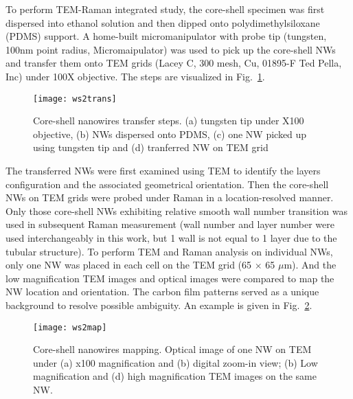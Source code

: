 To perform TEM-Raman integrated study, the core-shell specimen was first dispersed into ethanol solution and then dipped onto polydimethylsiloxane (PDMS) support. A home-built micromanipulator with probe tip (tungsten, 100nm point radius, Micromaipulator) was used to pick up the core-shell NWs and transfer them onto TEM grids (Lacey C, 300 mesh, Cu, 01895-F Ted Pella, Inc) under 100X objective. The steps are visualized in Fig.~\ref{fig:ch5ws2trans}. 
\begin{figure}[htb]
\centering
\texttt{[image: ws2trans]}
\caption[Core-shell nanowires transfer steps]{Core-shell nanowires transfer steps. (a) tungsten tip under X100 objective, (b) NWs dispersed onto PDMS, (c) one NW picked up using tungsten tip and (d) tranferred NW on TEM grid}
\label{fig:ch5ws2trans}
\end{figure}
The transferred NWs were first examined using TEM to identify the  layers configuration and the associated geometrical orientation. Then the core-shell NWs on TEM grids were probed under Raman in a location-resolved manner. Only those core-shell NWs exhibiting relative smooth  wall number transition was used in subsequent Raman measurement (wall number and layer number were used interchangeably in this work, but 1 wall is not equal to 1 layer due to the tubular structure). To perform TEM and Raman analysis on individual NWs, only one NW was placed in each cell on the TEM grid (65 $\times$ 65 $\mu$m). And the low magnification TEM images and optical images were compared to map the NW location and orientation. The carbon film patterns served as a unique background to resolve possible ambiguity. An example is given in Fig.~\ref{fig:ch5ws2map}. 
\begin{figure}[htb]
\centering
\texttt{[image: ws2map]}
\caption[Core-shell nanowires mapping]{Core-shell nanowires mapping. Optical image of one NW on TEM under (a) x100 magnification and (b) digital zoom-in view; (b) Low magnification and (d) high magnification TEM images on the same NW.}
\label{fig:ch5ws2map}
\end{figure}
